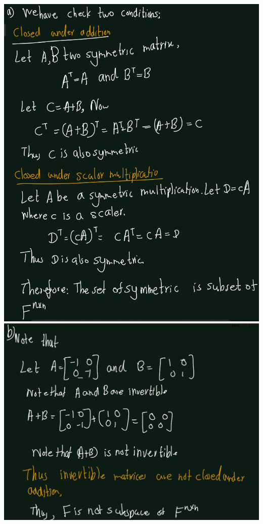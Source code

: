 \documentclass[
]{book}
\theoremstyle{definition}
\theoremstyle{definition}
\theoremstyle{definition}
\theoremstyle{definition}
\theoremstyle{remark}
\begin{document}
\includegraphics{figures/ch_3/ex-2.2-a.png}
\includegraphics{figures/ch_3/ex-2.2-b.png}
\end{document}
